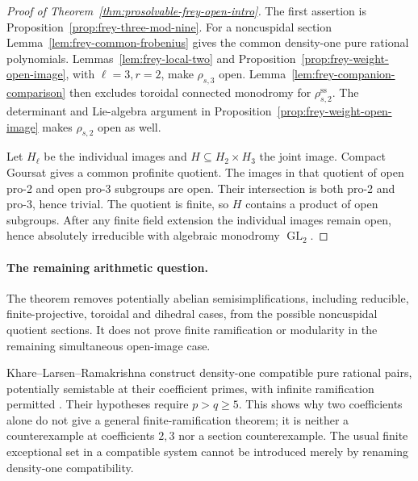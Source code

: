 \begin{proof}[Proof of Theorem~\ref{thm:prosolvable-frey-open-intro}]
The first assertion is Proposition~\ref{prop:frey-three-mod-nine}.
For a noncuspidal section Lemma~\ref{lem:frey-common-frobenius} gives the common
density-one pure rational polynomials.
Lemmas~\ref{lem:frey-local-two} and Proposition~\ref{prop:frey-weight-open-image},
with \(\ell=3,r=2\), make \(\rho_{s,3}\) open.
Lemma~\ref{lem:frey-companion-comparison} then excludes toroidal connected
monodromy for \(\rho_{s,2}^{\mathrm{ss}}\).
The determinant and Lie-algebra argument in
Proposition~\ref{prop:frey-weight-open-image} makes \(\rho_{s,2}\) open as well.

Let \(H_\ell\) be the individual images and \(H\subseteq H_2\times H_3\)
the joint image. Compact Goursat gives a common profinite quotient.
The images in that quotient of open pro-2 and open pro-3 subgroups
are open. Their intersection is both pro-2 and pro-3, hence trivial.
The quotient is finite, so \(H\) contains a product of open subgroups.
After any finite field extension the individual images remain open,
hence absolutely irreducible with algebraic monodromy \(\operatorname{GL}_2\).
\end{proof}

\paragraph{The remaining arithmetic question.}

The theorem removes potentially abelian semisimplifications, including
reducible, finite-projective, toroidal and dihedral cases, from the
possible noncuspidal quotient sections. It does not prove finite
ramification or modularity in the remaining simultaneous open-image
case.

Khare--Larsen--Ramakrishna construct density-one compatible pure rational
pairs, potentially semistable at their coefficient primes, with infinite
ramification permitted
\cite[\S2.4, Corollary~14, manuscript pp.~23--24]{KhareLarsenRamakrishna2005}.
Their hypotheses require \(p>q\ge5\). This shows why two coefficients
alone do not give a general finite-ramification theorem; it is neither
a counterexample at coefficients \(2,3\) nor a section counterexample.
The usual finite exceptional set in a compatible system cannot be
introduced merely by renaming density-one compatibility.

